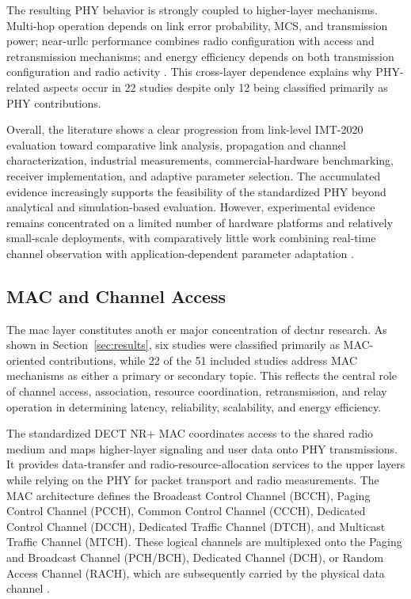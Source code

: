The resulting PHY behavior is strongly coupled to higher-layer mechanisms. Multi-hop operation depends on link error probability, MCS, and transmission power; near-\gls{urllc} performance combines radio configuration with access and retransmission mechanisms; and energy efficiency depends on both transmission configuration and radio activity \cite{soniLinkLevelAssessmentNOMA2023, samuylovEmpoweringNearURLLCIoT2025, bandaraExperimentalValidationAnalysis2025, grafParetoOptimalityApproach2026a}. This cross-layer dependence explains why PHY-related aspects occur in 22 studies despite only 12 being classified primarily as PHY contributions.

Overall, the literature shows a clear progression from link-level IMT-2020 evaluation toward comparative link analysis, propagation and channel characterization, industrial measurements, commercial-hardware benchmarking, receiver implementation, and adaptive parameter selection. The accumulated evidence increasingly supports the feasibility of the standardized PHY beyond analytical and simulation-based evaluation. However, experimental evidence remains concentrated on a limited number of hardware platforms and relatively small-scale deployments, with comparatively little work combining real-time channel observation with application-dependent parameter adaptation \cite{fagerholmFPGAbasedDECT2020New2024, bandaraExperimentalValidationAnalysis2025, grafWhatExpectWhen2026, grafParetoOptimalityApproach2026a}.

\subsection{MAC and Channel Access}
\label{subsec:mac}

The \gls{mac} layer constitutes anoth er major concentration of \gls{dectnr} research. As shown in Section~\ref{sec:results}, six studies were classified primarily as MAC-oriented contributions, while 22 of the 51 included studies address MAC mechanisms as either a primary or secondary topic. This reflects the central role of channel access, association, resource coordination, retransmission, and relay operation in determining latency, reliability, scalability, and energy efficiency.

The standardized DECT NR+ MAC coordinates access to the shared radio medium and maps higher-layer signaling and user data onto PHY transmissions. It provides data-transfer and radio-resource-allocation services to the upper layers while relying on the PHY for packet transport and radio measurements. The MAC architecture defines the Broadcast Control Channel (BCCH), Paging Control Channel (PCCH), Common Control Channel (CCCH), Dedicated Control Channel (DCCH), Dedicated Traffic Channel (DTCH), and Multicast Traffic Channel (MTCH). These logical channels are multiplexed onto the Paging and Broadcast Channel (PCH/BCH), Dedicated Channel (DCH), or Random Access Channel (RACH), which are subsequently carried by the physical data channel \cite{etsi_ts103636_4,etsi_ts_103636_4_r2}.

